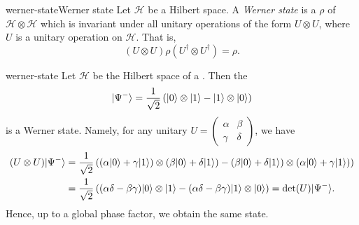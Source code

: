 \begin{topic}{werner-state}{Werner state}
    Let $\mathcal{H}$ be a Hilbert space. A \emph{Werner state} is a  $\rho$ of $\mathcal{H} \otimes \mathcal{H}$ which is invariant under all unitary operations of the form $U \otimes U$, where $U$ is a unitary operation on $\mathcal{H}$. That is,
    \[ (U \otimes U) \rho (U^\dagger \otimes U^\dagger) = \rho . \]
\end{topic}

\begin{example}{werner-state}
    Let $\mathcal{H}$ be the Hilbert space of a . Then the 
    \[ |\Psi^-\rangle = \frac{1}{\sqrt{2}} \left( |0\rangle \otimes |1\rangle - |1\rangle \otimes |0\rangle \right) \]
    is a Werner state. Namely, for any unitary $U = \begin{pmatrix} \alpha & \beta \\ \gamma & \delta \end{pmatrix}$, we have
    \[ \begin{aligned}
        (U \otimes U) |\Psi^-\rangle
            &= \frac{1}{\sqrt{2}} \left( (\alpha |0\rangle + \gamma |1\rangle) \otimes (\beta |0\rangle + \delta |1\rangle) - (\beta |0\rangle + \delta |1\rangle) \otimes (\alpha |0\rangle + \gamma |1\rangle) \right) \\
            &= \frac{1}{\sqrt{2}} \left( (\alpha \delta - \beta \gamma) |0\rangle \otimes |1\rangle - (\alpha \delta - \beta \gamma) |1\rangle \otimes |0\rangle \right) = \det(U) |\Psi^-\rangle .
    \end{aligned} \]
    Hence, up to a global phase factor, we obtain the same state.
\end{example}
